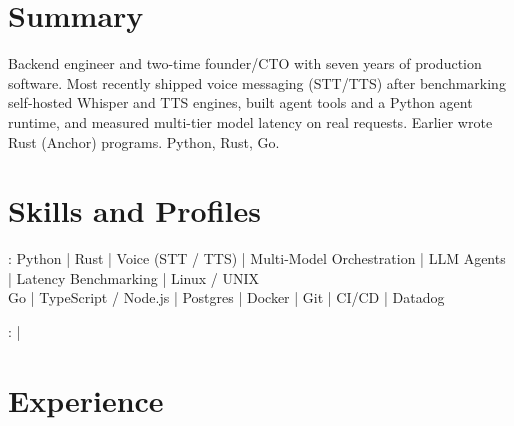 \documentclass[print]{jack-resume}
\begin{document}
\pagecolor{darkmodeBackground}


\begin{minipage}[t][1cm][t]{.03\textwidth}
    \hfill
\end{minipage}

\section{Summary}
Backend engineer and two-time founder/CTO with seven years of production software. Most recently shipped voice messaging (STT/TTS) after benchmarking self-hosted Whisper and TTS engines, built agent tools and a Python agent runtime, and measured multi-tier model latency on real requests. Earlier wrote Rust (Anchor) programs. Python, Rust, Go.
\sectionsep

\section{Skills and Profiles}
:
Python \hfill | \hfill
Rust \hfill | \hfill
Voice (STT / TTS) \hfill | \hfill
Multi-Model Orchestration \hfill | \hfill
LLM Agents \hfill | \hfill
Latency Benchmarking \hfill | \hfill
Linux / UNIX \\
\hspace{1.0cm} Go \hfill | \hfill
TypeScript / Node.js \hfill | \hfill
Postgres \hfill | \hfill
Docker \hfill | \hfill
Git \hfill | \hfill
CI/CD \hfill | \hfill
Datadog \\

\raggedright{
    :
      \href{https://www.linkedin.com/in/jack-sturtevant/}{ \ExternalLink} |
     \href{https://github.com/jacksturt}{ \ExternalLink}}

\section{Experience}
\end{document}
